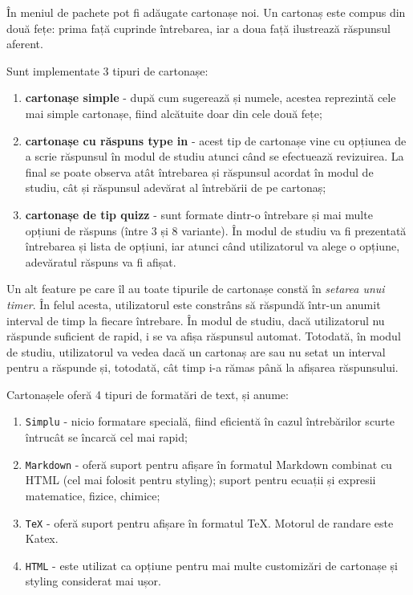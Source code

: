 În meniul de pachete pot fi adăugate cartonașe noi. Un cartonaș este compus din două fețe: prima față cuprinde întrebarea, iar a doua față ilustrează răspunsul aferent.

Sunt implementate 3 tipuri de cartonașe:
\begin{enumerate}
    \item \textbf{cartonașe simple} - după cum sugerează și numele, acestea reprezintă cele mai simple cartonașe, fiind alcătuite doar din cele două fețe;
    \item \textbf{cartonașe cu răspuns type in} - acest tip de cartonașe vine cu opțiunea de a scrie răspunsul în modul de studiu atunci când se efectuează revizuirea. La final se poate observa atât întrebarea și răspunsul acordat în modul de studiu, cât și răspunsul adevărat al întrebării de pe cartonaș;
    \item \textbf{cartonașe de tip quizz} - sunt formate dintr-o întrebare și mai multe opțiuni de răspuns (între 3 și 8 variante). În modul de studiu va fi prezentată întrebarea și lista de opțiuni, iar atunci când utilizatorul va alege o opțiune, adevăratul răspuns va fi afișat.
\end{enumerate}

Un alt feature pe care îl au toate tipurile de cartonașe constă în \textit{setarea unui timer}. În felul acesta, utilizatorul este constrâns să răspundă într-un anumit interval de timp la fiecare întrebare. În modul de studiu, dacă utilizatorul nu răspunde suficient de rapid, i se va afișa răspunsul automat. Totodată, în modul de studiu, utilizatorul va vedea dacă un cartonaș are sau nu setat un interval pentru a răspunde și, totodată, cât timp i-a rămas până la afișarea răspunsului.

Cartonașele oferă 4 tipuri de formatări de text, și anume:
\begin{enumerate}
    \item \texttt{Simplu} - nicio formatare specială, fiind eficientă în cazul întrebărilor scurte întrucât se încarcă cel mai rapid;
    \item \texttt{Markdown} - oferă suport pentru afișare în formatul Markdown combinat cu HTML (cel mai folosit pentru styling); suport pentru ecuații și expresii matematice, fizice, chimice;
    \item \texttt{TeX} - oferă suport pentru afișare în formatul TeX. Motorul de randare este Katex.
    \item \texttt{HTML} - este utilizat ca opțiune pentru mai multe customizări de cartonașe și styling considerat mai ușor.
\end{enumerate}

